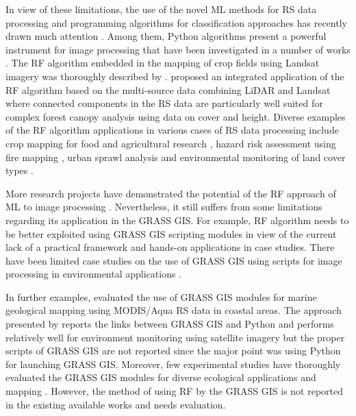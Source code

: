 \documentclass[eprint,
approc,		%
]{actapoly}
\begin{document}
In view of these limitations, the use of the novel ML methods for RS data processing and programming algorithms for classification approaches has recently drawn much attention \citep{Ayhan}. Among them, Python algorithms present a powerful instrument for image processing that have been investigated in a number of works \citep{9884244,9883588,Lemenkova202227,9006205,7724471}. The RF algorithm embedded in the mapping of crop fields using Landsat imagery was thoroughly described by \citep{LUCIANO2021106063}. \citep{AHMED201589} proposed an integrated application of the RF algorithm based on the multi-source data combining LiDAR and Landsat where connected components in the RS data are particularly well suited for complex forest canopy analysis using data on cover and height. Diverse examples of the RF algorithm applications in various cases of RS data processing include crop mapping for food and agricultural research \citep{OLIPHANT2019110,TELUGUNTLA2018325}, hazard risk assessment using fire mapping \citep{COLLINS2020111839}, urban sprawl analysis \citep{GHOSH201431} and environmental monitoring of land cover types \citep{MELVILLE201846,GRINAND201368}. 

More research projects have demonstrated the potential of the RF approach of ML to image processing \citep{COLLINS2020111839,WEI2020112005,WANG202294}. Nevertheless, it still suffers from some limitations regarding its application in the GRASS GIS. For example, RF algorithm needs to be better exploited using GRASS GIS scripting modules in view of the current lack of a practical framework and hands-on applications in case studies. There have been limited case studies on the use of GRASS GIS using scripts for image processing in environmental applications \citep{STRIGARO201668,geomatics5010005,ROCCHINI2017166,7326254}. 

In further examples, \citep{7326254} evaluated the use of GRASS GIS modules for marine geological mapping using MODIS/Aqua RS data in coastal areas. The approach presented by \citep{6407912} reports the links between GRASS GIS and Python and performs relatively well for environment monitoring using satellite imagery but the proper scripts of GRASS GIS are not reported since the major point was using Python for launching GRASS GIS. Moreover, few experimental studies have thoroughly evaluated the GRASS GIS modules for diverse ecological applications and mapping \citep{lemenkova2024exploitation}. However, the method of using RF by the GRASS GIS is not reported in the existing available works and needs evaluation.
\end{document}
